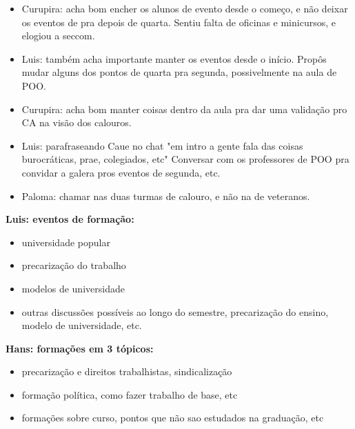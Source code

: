 \documentclass{ata-calico}
\begin{document}
\begin{itemize}
\item Curupira: acha bom encher os alunos de evento desde o começo, e não deixar os eventos de pra depois de quarta.
Sentiu falta de oficinas e minicursos, e elogiou a seccom.

\item Luis: também acha importante manter os eventos desde o início. Propôs mudar alguns dos pontos de quarta pra segunda, possivelmente na aula de POO.

\item Curupira: acha bom manter coisas dentro da aula pra dar uma validação pro CA na visão dos calouros.

\item Luis: parafraseando Caue no chat "em intro a gente fala das coisas burocráticas, prae, colegiados, etc"
Conversar com os professores de POO pra convidar a galera pros eventos de segunda, etc.

\item Paloma: chamar nas duas turmas de calouro, e não na de veteranos.
\end{itemize}

\textbf{Luis: eventos de formação:}
\begin{itemize}
\item universidade popular
\item precarização do trabalho
\item modelos de universidade
\item outras discussões possíveis ao longo do semestre, precarização do ensino, modelo de universidade, etc.
\end{itemize}

\textbf{Hans: formações em 3 tópicos:}
\begin{itemize}
\item precarização e direitos trabalhistas, sindicalização
\item formação política, como fazer trabalho de base, etc
\item formações sobre curso, pontos que não sao estudados na graduação, etc
\end{itemize}
\end{document}
